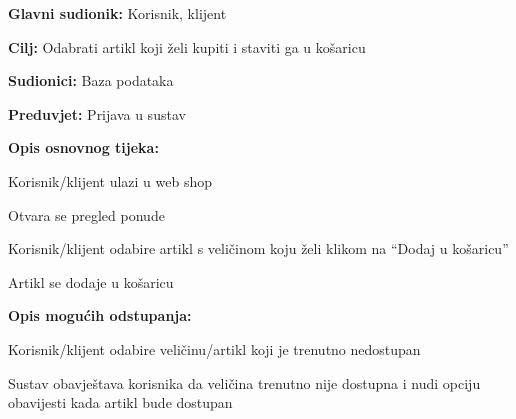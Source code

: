 				\noindent {}
				\begin{packed_item}
					
					\item \textbf{Glavni sudionik: } Korisnik, klijent
					\item  \textbf{Cilj:} Odabrati artikl koji želi kupiti i staviti ga u košaricu
					\item  \textbf{Sudionici:} Baza podataka
					\item  \textbf{Preduvjet:}  Prijava u sustav
					\item  \textbf{Opis osnovnog tijeka:}
					
					\item[] \begin{packed_enum}
						\item Korisnik/klijent ulazi u web shop
						\item Otvara se pregled ponude
						\item Korisnik/klijent odabire artikl s veličinom koju želi klikom na “Dodaj u košaricu”
						\item Artikl se dodaje u košaricu
					\end{packed_enum}
					\item  \textbf{Opis mogućih odstupanja:}
					\item[] \begin{packed_item}
						\item[3.a]      Korisnik/klijent odabire veličinu/artikl koji je trenutno nedostupan
						\item[] \begin{packed_enum}
							\item         Sustav obavještava korisnika da veličina trenutno nije dostupna i nudi opciju obavijesti kada artikl bude dostupan
						\end{packed_enum}
					\end{packed_item}
				\end{packed_item}
				
				\pagebreak
				
